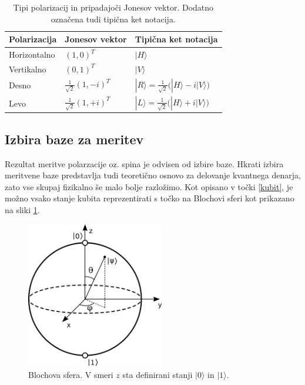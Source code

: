 \documentclass[12pt]{article}
\begin{document}
\begin{table}[h]
\centering
\renewcommand{\arraystretch}{1.5} %
\begin{tabular}{|l|l|l|}

\hline
\textbf{Polarizacija} & \textbf{Jonesov vektor}                                       & \textbf{Tipična ket notacija}                                                               \\ \hline
Horizontalno          & $ (1,0)^T $                          & $ |H\rangle $                                                                               \\ \hline
Vertikalno            & $(0,1)^T$                          & $ |V\rangle $                                                                               \\ \hline
Desno                 & ${\frac  {1}{{\sqrt  2}}}{(1, -i)^T}$ & $ { |R\rangle ={\frac {1}{\sqrt {2}}}{\big (}|H\rangle -i|V\rangle {\big )}} $ \\ \hline
Levo                  & $ {\frac  {1}{{\sqrt  2}}}{(1, +i)^T} $ & $ { |L\rangle ={\frac {1}{\sqrt {2}}}{\big (}|H\rangle +i|V\rangle {\big )}} $ \\ \hline
\end{tabular}
\caption{Tipi polarizacij in pripadajoči Jonesov vektor. Dodatno označena tudi tipična ket notacija. \cite{JonesCalculus2023} }
\label{tab:pol}
\end{table}

\subsection{Izbira baze za meritev}

\par Rezultat meritve polarzacije oz. spina je odvisen od izbire baze. Hkrati izbira meritvene baze predstavlja tudi teoretično osnovo za delovanje kvantnega denarja, zato vse skupaj fizikalno še malo bolje razložimo. Kot opisano v točki \ref{kubit}, je možno vsako stanje kubita reprezentirati s točko na Blochovi sferi kot prikazano na sliki \ref{fig:bloch}. 

\begin{figure}[H]
\includegraphics[width=6cm]{bloch.png}
\centering
\caption{Blochova sfera. V smeri $z$ sta definirani stanji $| 0 \rangle$ in $| 1 \rangle$. \cite{BlochSphere2023}}
\label{fig:bloch}
\end{figure}
\end{document}
